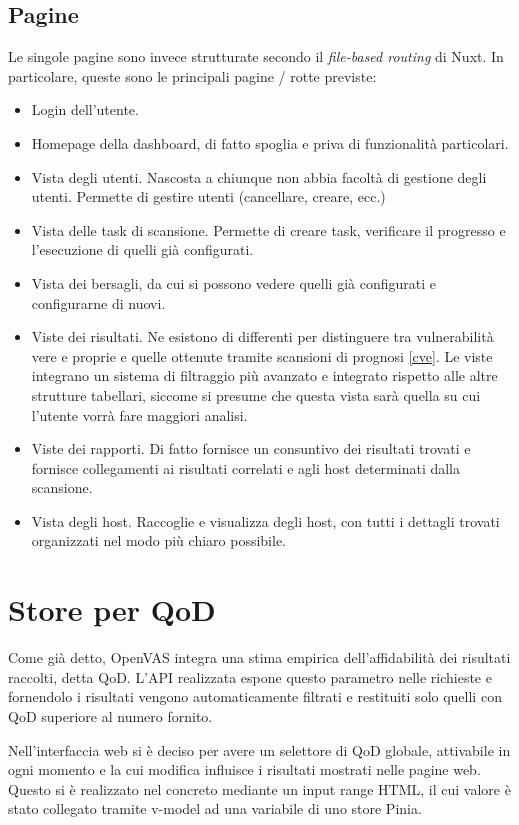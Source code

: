 \subsection{Pagine}
Le singole pagine sono invece strutturate secondo il \emph{file-based routing} di Nuxt. In particolare, queste sono le principali pagine / rotte previste:
\begin{itemize}
    \item Login dell'utente.
    \item Homepage della dashboard, di fatto spoglia e priva di funzionalità particolari.
    \item Vista degli utenti. Nascosta a chiunque non abbia facoltà di gestione degli utenti. Permette di gestire utenti (cancellare, creare, ecc.)
    \item Vista delle task di scansione. Permette di creare task, verificare il progresso e l'esecuzione di quelli già configurati.
    \item Vista dei bersagli, da cui si possono vedere quelli già configurati e configurarne di nuovi.
    \item Viste dei risultati. Ne esistono di differenti per distinguere tra vulnerabilità vere e proprie e quelle ottenute tramite scansioni di prognosi \ref{cve}. Le viste integrano un sistema di filtraggio più avanzato e integrato rispetto alle altre strutture tabellari, siccome si presume che questa vista sarà quella su cui l'utente vorrà fare maggiori analisi.
    \item Viste dei rapporti. Di fatto fornisce un consuntivo dei risultati trovati e fornisce collegamenti ai risultati correlati e agli host determinati dalla scansione.
    \item Vista degli host. Raccoglie e visualizza degli host, con tutti i dettagli trovati organizzati nel modo più chiaro possibile.
\end{itemize}

\section{Store per QoD}
Come già detto, OpenVAS integra una stima empirica dell'affidabilità dei risultati raccolti, detta QoD. L'API realizzata espone questo parametro nelle richieste e fornendolo i risultati vengono automaticamente filtrati e restituiti solo quelli con QoD superiore al numero fornito.

Nell'interfaccia web si è deciso per avere un selettore di QoD globale, attivabile in ogni momento e la cui modifica influisce i risultati mostrati nelle pagine web. Questo si è realizzato nel concreto mediante un input range HTML, il cui valore è stato collegato tramite v-model ad una variabile di uno store Pinia.

